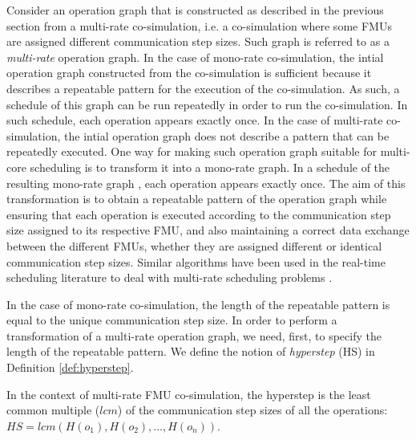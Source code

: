 Consider an operation graph that is constructed as described in the previous section from a multi-rate co-simulation, i.e. a co-simulation where some FMUs are assigned different communication step sizes. Such graph is referred to as a \textit{multi-rate} operation graph. In the case of mono-rate co-simulation, the intial operation graph constructed from the co-simulation is sufficient because it describes a repeatable pattern for the execution of the co-simulation. As such, a schedule of this graph can be run repeatedly in order to run the co-simulation. In such schedule, each operation appears exactly once. In the case of multi-rate co-simulation, the intial operation graph does not describe a pattern that can be repeatedly executed. One way for making such operation graph suitable for multi-core scheduling is to transform it into a mono-rate graph. In a schedule of the resulting mono-rate graph , each operation appears exactly once. The aim of this transformation is to obtain a repeatable pattern of the operation graph while ensuring that each operation is executed according to the communication step size assigned to its respective FMU, and also maintaining a correct data exchange between the different FMUs, whether they are assigned different or identical communication step sizes. Similar algorithms have been used in the real-time scheduling literature to deal with multi-rate scheduling problems \cite{kermia:2009, ramamritham:1995}.

In the case of mono-rate co-simulation, the length of the repeatable pattern is equal to the unique communication step size. In order to perform a transformation of a multi-rate operation graph, we need, first, to specify the length of the repeatable pattern. We define the notion of \textit{hyperstep} (HS) in Definition \ref{def:hyperstep}. 

\begin{definition}
In the context of multi-rate FMU co-simulation, the hyperstep is the least common multiple ($lcm$) of the communication step sizes of all the operations: $HS=lcm(H(o_1),H(o_2), \dots ,H(o_n))$.
\label{def:hyperstep}
\end{definition}

